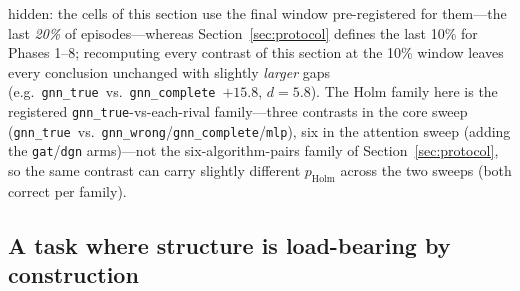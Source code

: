 \documentclass[10pt]{article}
\newcommand{\gtrue}{\texttt{gnn\_true}}
\newcommand{\gwrong}{\texttt{gnn\_wrong}}
\newcommand{\gcomplete}{\texttt{gnn\_complete}}
\newcommand{\mlpc}{\texttt{mlp}}
\begin{document}
hidden: the cells of this section use the final window pre-registered for
them---the last \emph{20\%} of episodes---whereas
Section~\ref{sec:protocol} defines the last 10\% for Phases 1--8;
recomputing every contrast of this section at the 10\% window leaves every
conclusion unchanged with slightly \emph{larger} gaps (e.g.\ \gtrue\ vs.\
\gcomplete\ $+15.8$, $d=5.8$). The Holm family here is the
registered \gtrue-vs-each-rival family---three contrasts in the core sweep
(\gtrue\ vs.\ \gwrong/\gcomplete/\mlpc), six in the attention sweep (adding the
\texttt{gat}/\texttt{dgn} arms)---not the six-algorithm-pairs family of
Section~\ref{sec:protocol}, so the same contrast can carry slightly different
$p_{\text{Holm}}$ across the two sweeps (both correct per family).

\subsection{A task where structure is load-bearing by construction}
\label{sec:pairrouting}
\end{document}

